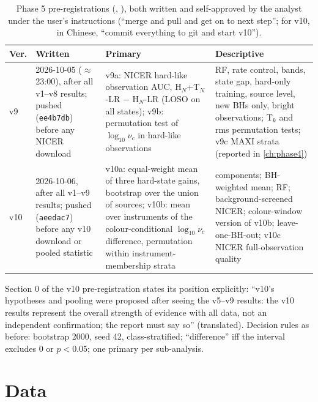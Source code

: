 \begin{table}[htbp]
\centering\footnotesize
\caption[Phase 5 pre-registrations]{Phase 5 pre-registrations (,
), both written and self-approved by the analyst under the user's instructions (``merge and
pull and get on to next step''; for v10, in Chinese, ``commit everything to git and start v10'').}
\label{tab:p5prereg}
\begin{tabularx}{\textwidth}{@{}p{0.8cm}p{3.0cm}>{\raggedright\arraybackslash}X>{\raggedright\arraybackslash}X@{}}
\toprule
Ver. & Written & Primary & Descriptive \\
\midrule
v9 & 2026-10-05 ($\approx$23:00), after all v1--v8 results; pushed (\texttt{ee4b7db}) before any NICER download & v9a: NICER hard-like observation AUC, H$_N$+T$_N$-LR $-$ H$_N$-LR (LOSO on all states); v9b: permutation test of $\log_{10}\nu_c$ in hard-like observations & RF, rate control, bands, state gap, hard-only training, source level, new BHs only, bright observations; T$_k$ and rms permutation tests; v9c MAXI strata (reported in \cref{ch:phase4}) \\
v10 & 2026-10-06, after all v1--v9 results; pushed (\texttt{aeedac7}) before any v10 download or pooled statistic & v10a: equal-weight mean of three hard-state gains, bootstrap over the union of sources; v10b: mean over instruments of the colour-conditional $\log_{10}\nu_c$ difference, permutation within instrument-membership strata & components; BH-weighted mean; RF; background-screened NICER; colour-window version of v10b; leave-one-BH-out; v10c NICER full-observation quality \\
\bottomrule
\end{tabularx}
\end{table}

Section 0 of the v10 pre-registration states its position explicitly: ``v10's hypotheses and pooling were proposed after seeing
the v5--v9 results: the v10 results represent the overall strength of evidence with all data, not an independent
confirmation; the report must say so'' (translated). Decision rules as before: bootstrap 2000, seed 42, class-stratified;
``difference'' iff the interval excludes 0 or $p<0.05$; one primary per sub-analysis.

\section{Data}
